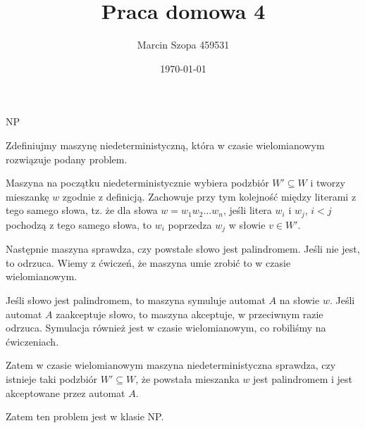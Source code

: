\documentclass{article}
\title{Praca domowa 4}
\author{Marcin Szopa 459531}
\date{\today}
\theoremstyle{definition}
\theoremstyle{remark}
\begin{document}
\maketitle

\begin{section}{NP}

 Zdefiniujmy maszynę niedeterministyczną, która w czasie wielomianowym
 rozwiązuje podany problem.

 Maszyna na początku niedeterministycznie wybiera podzbiór $W' \subseteq W$ i
 tworzy mieszankę $w$ zgodnie z definicją. Zachowuje przy tym kolejność między
 literami z tego samego słowa, tz. że dla słowa $w = w_1 w_2 \ldots w_n$, jeśli
 litera $w_i$ i $w_j$, $ i < j$ pochodzą z tego samego słowa, to $w_i$ poprzedza
 $w_j$ w słowie $v \in W'$.

 Następnie maszyna sprawdza, czy powstałe słowo jest palindromem. Jeśli nie
 jest, to odrzuca. Wiemy z ćwiczeń, że maszyna umie zrobić to w czasie
 wielomianowym.

 Jeśli słowo jest palindromem, to maszyna symuluje automat $A$ na słowie $w$.
 Jeśli automat $A$ zaakceptuje słowo, to maszyna akceptuje, w przeciwnym razie
 odrzuca. Symulacja również jest w czasie wielomianowym, co robiliśmy na
 ćwiczeniach.

 Zatem w czasie wielomianowym maszyna niedeterministyczna sprawdza, czy istnieje
 taki podzbiór $W' \subseteq W$, że powstała mieszanka $w$ jest palindromem i
 jest akceptowane przez automat $A$.

 Zatem ten problem jest w klasie NP.

\end{section}
\end{document}
